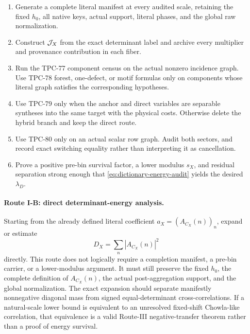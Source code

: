 \begin{enumerate}[label=(I\arabic*),leftmargin=2.7em]
\item Generate a complete literal manifest at every audited scale,
retaining the fixed \(h_0\), all native keys, actual support, literal
phases, and the global raw normalization.
\item Construct \(\mathcal J_X\) from the exact determinant label and archive
every multiplier and provenance contribution in each fiber.
\item Run the TPC-77 component census on the actual nonzero incidence
graph.  Use TPC-78 forest, one-defect, or motif formulas only on
components whose literal graph satisfies the corresponding
hypotheses.
\item Use TPC-79 only when the anchor and direct variables are
separable syntheses into the same target with the physical costs.
Otherwise delete the hybrid branch and keep the direct route.
\item Use TPC-80 only on an actual scalar row graph.  Audit both
sectors, and record exact switching equality rather than interpreting
it as cancellation.
\item Prove a positive pre-bin survival factor, a lower modulus
\(s_X\), and residual separation strong enough that
\eqref{eq:dictionary-energy-audit} yields the desired
\(\lambda_D\).
\end{enumerate}

\paragraph{Route I-B: direct determinant-energy analysis.}
Starting from the already defined literal coefficient
\(a_X=(A_{C_X}(n))_n\), expand or estimate
\[
 D_X=\sum_n|A_{C_X}(n)|^2
\]
directly.  This route does not logically require a completion
manifest, a pre-bin carrier, or a lower-modulus argument.  It must
still preserve the fixed \(h_0\), the complete definition of
\(A_{C_X}(n)\), the actual post-aggregation support, and the global
normalization.  The exact expansion should separate manifestly
nonnegative diagonal mass from signed equal-determinant
cross-correlations.  If a natural-scale lower bound is equivalent to
an unresolved fixed-shift Chowla-like correlation, that equivalence is
a valid Route-III negative-transfer theorem rather than a proof of
energy survival.

